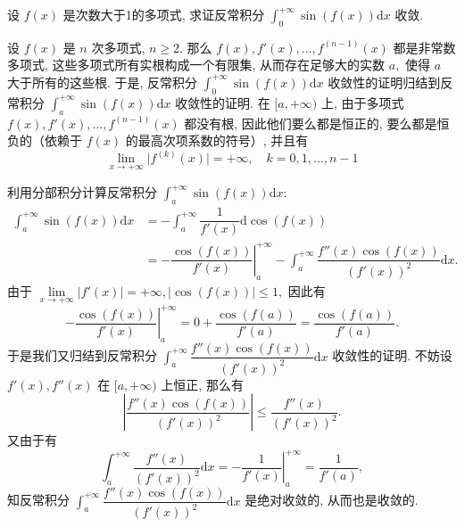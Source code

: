 \begin{question}[points = 10]
  设 $f(x)$ 是次数大于1的多项式, 求证反常积分 $\int_{0}^{+\infty} \sin(f(x)) \mathrm{d}x$ 收敛.

\end{question}

\begin{solution}
  设 $f(x)$ 是 $n$ 次多项式, $n \geqslant 2.$ 那么 $f(x), f'(x), \dots, f^{(n-1)}(x)$ 都是非常数多项式, 这些多项式所有实根构成一个有限集, 从而存在足够大的实数 $a,$ 使得 $a$ 大于所有的这些根. 于是, 反常积分 $\int_{0}^{+\infty} \sin(f(x)) \mathrm{d}x$ 收敛性的证明归结到反常积分 $\int_{a}^{+\infty} \sin(f(x)) \mathrm{d}x$ 收敛性的证明. 在 $[a, +\infty)$ 上, 由于多项式 $f(x), f'(x), \dots, f^{(n-1)}(x)$ 都没有根, 因此他们要么都是恒正的, 要么都是恒负的（依赖于 $f(x)$ 的最高次项系数的符号）, 并且有
  $$\lim\limits_{x \to +\infty} \lvert f^{(k)}(x) \rvert = +\infty, \quad k = 0, 1, \dots, n-1$$

  利用分部积分计算反常积分 $\int_{a}^{+\infty} \sin(f(x)) \mathrm{d}x:$
  \begin{align*}
    \int_{a}^{+\infty} \sin(f(x)) \mathrm{d}x & = -\int_{a}^{+\infty} \dfrac{1}{f'(x)} \mathrm{d} \cos(f(x)) \\
    & = - \left. \dfrac{\cos(f(x))}{f'(x)} \right|_{a}^{+\infty} - \int_{a}^{+\infty} \dfrac{f''(x) \cos(f(x))}{\left(f'(x)\right)^2} \mathrm{d}x.
  \end{align*}
  由于 $\lim\limits_{x \to +\infty} \lvert f'(x) \rvert = +\infty, \lvert \cos(f(x)) \rvert \leqslant 1,$ 因此有
  $$- \left. \dfrac{\cos(f(x))}{f'(x)} \right|_{a}^{+\infty} = 0 + \dfrac{\cos(f(a))}{f'(a)} = \dfrac{\cos(f(a))}{f'(a)}.$$
  于是我们又归结到反常积分 $\int_{a}^{+\infty} \dfrac{f''(x) \cos(f(x))}{\left(f'(x)\right)^2} \mathrm{d}x$ 收敛性的证明. 不妨设 $f'(x), f''(x)$ 在 $[a, +\infty)$ 上恒正, 那么有
  $$\left\lvert \dfrac{f''(x) \cos(f(x))}{\left(f'(x)\right)^2} \right\rvert \leqslant \dfrac{f''(x)}{\left(f'(x)\right)^2}.$$
  又由于有
  $$\int_{a}^{+\infty} \dfrac{f''(x)}{\left(f'(x)\right)^2} \mathrm{d}x = - \left. \dfrac{1}{f'(x)} \right|_{a}^{+\infty} = \dfrac{1}{f'(a)}, $$
  知反常积分 $\int_{a}^{+\infty} \dfrac{f''(x) \cos(f(x))}{\left(f'(x)\right)^2} \mathrm{d}x$ 是绝对收敛的, 从而也是收敛的.
\end{solution}

